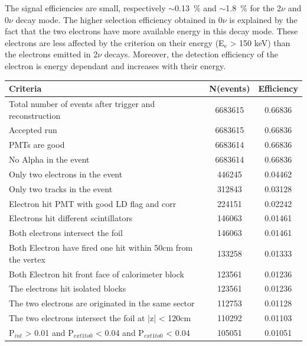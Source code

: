\documentclass[main.tex]{subfiles}
\begin{document}
\NI The signal efficiencies are small, respectively $\sim$0.13~\% and $\sim$1.8~\% for the 2$\nu$ and 0$\nu$ decay mode. The higher selection efficiency obtained in 0$\nu$ is explained by the fact that the two electrons have more available energy in this decay mode. These electrons are less affected by the criterion on their energy (E$_\text{e}$ > 150 keV) than the electrons emitted in 2$\nu$ decays. Moreover, the detection efficiency of the electron is energy dependant and increases with their energy. 



\ifx
\begin{table}[h!]
\begin{center}
\begin{tabular}{l|c|c}
                                                            Criteria   &  N(events)     &  Efficiency \\
\toprule
               Total number of events after trigger and reconstruction  &    6683615    &     0.66836\\
                                                          Accepted run  &    6683615    &     0.66836\\
                                                         PMTs are good  &    6683614    &     0.66836\\
                                                 No Alpha in the event  &    6683614    &     0.66836\\
                                       Only two electrons in the event  &     446245    &     0.04462\\
                                          Only two tracks in the event  &     312843    &     0.03128\\
                           Electron hit PMT with good LD flag and corr  &     224151    &     0.02242\\
                                 Electrons hit different scintillators  &     146063    &     0.01461\\
                                     Both electrons intersect the foil  &     146063    &     0.01461\\
          Both Electron have fired one hit within 50cm from the vertex  &     133258    &     0.01333\\
                     Both Electron hit front face of calorimeter block  &     123561    &     0.01236\\
                                     The electrons hit isolated blocks  &     123561    &     0.01236\\
                   The two electrons are originated in the same sector  &     112753    &     0.01128\\
                   The two electrons intersect the foil at |z| < 120cm  &     110292    &     0.01103\\
P$_{int}$ > 0.01 and P$_{ext1 to 0}$ < 0.04 and P$_{ext1 to 0}$ < 0.04  &     105051    &     0.01051\\


\end{tabular}
\end{center}
\end{table}
\end{document}
